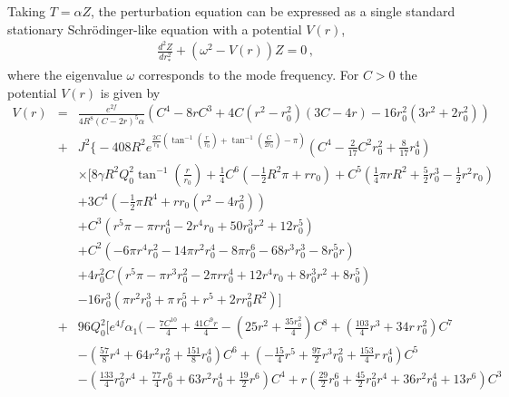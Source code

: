 \documentclass[aps,prd,12pt,superscriptaddress]{revtex4-2}
\begin{document}
Taking $T =\alpha Z$, the perturbation equation can be expressed as a single standard stationary Schrödinger-like equation with a potential $V(r)$,
\begin{eqnarray}
\label{schroe}
    \frac{d^2 Z}{d{r^2_*}}
    + (\omega^2 - V(r))Z = 0 \, ,
\end{eqnarray}
where the eigenvalue $\omega$ corresponds to the mode frequency.
For $C>0$ the potential $V(r)$ is given by
\begin{eqnarray}
    V(r) &=&
    \frac{e^{2f} }{4 R^8 (C-2r)^5    \alpha} 
  (C^4-8rC^3+4C (r^2-r_0^2) (3C-4r) - 16r_0^2 (3r^2+2r_0^2) )
  \nonumber 
  \\    
   &+&  J^2 \big\{
-408
R^{2} { e}^{\frac{2 C}{r_0}  (\tan^{-1}(\frac{r}{r_0}) +\tan^{-1}(\frac{C}{2 r_0}) -\pi)}
(C^{4}-\frac{2}{17} C^{2} r_0^{2}+\frac{8}{17} r_0^{4}) 
 \nonumber 
  \\  &&  \times 
[8 \gamma R^{2}  Q_0^{2} \tan^{-1}\left(\frac{r}{r_0}\right)
+ \frac{1}{4} C^{6} (-\frac{1}{2} R^{2} \pi 
+ r r_0 ) +  C^{5}
(\frac{1}{4} \pi  r R^{2}+\frac{5}{2} r_0^{3} -\frac{1}{2} r^{2} r_0 )
 \nonumber 
  \\   &&
+3  C^{4} (-\frac{1}{2} \pi R^4 + rr_0 (r^2 -4 r_0^{2}) )
 \nonumber 
  \\ &&   
+C^{3} (r^{5} \pi -\pi  r r_0^{4}-2 r^{4} r_0 +50 r_0^{3} r^{2}+12 r_0^{5}) 
 \nonumber 
  \\ &&   
+C^{2} (-6 \pi  r^{4} r_0^{2}-14 \pi  r^{2} r_0^{4}-8 \pi  r_0^{6}-68 r^{3} r_0^{3}-8 r_0^{5} r ) 
 \nonumber 
  \\ &&   
+4 r_0^{2} C (r^{5} \pi -\pi  r^{3} r_0^{2}-2 \pi  r r_0^{4}+12 r^{4} r_0 +8 r_0^{3} r^{2}+8 r_0^{5})  
 \nonumber 
  \\ &&   
-16 r_0^{3} (\pi  r^{2} r_0^{3}+\pi  \,r_0^{5}+r^{5}+2 r r_0^{2} R^2)
] 
 \nonumber 
 \\
&+& 96 Q_0^{2} \big[
{ e}^{4f} \alpha_1 
\big(
 -\frac{7 C^{10}}{4}+\frac{41 C^{9} r}{4}
-(25 r^{2}+\frac{35 r_0^{2}}{4}) C^{8}
+(\frac{103}{4} r^{3}+34 r \,r_0^{2}) C^{7}
 \nonumber 
  \\ &&   
-(\frac{57}{8} r^{4}+64 r^{2} r_0^{2}+\frac{151}{8} r_0^{4}) C^{6}
+(-\frac{15}{4} r^{5}
+\frac{97}{2} r^{3} r_0^{2}+\frac{153}{4} r \,r_0^{4}) C^{5}
 \nonumber 
  \\ &&   
-(\frac{133}{4} r_0^{2} r^{4}+\frac{77}{4} r_0^{6}+63 r^{2} r_0^{4}+\frac{19}{2} r^{6}) C^{4}+r (\frac{29}{2} r_0^{6}+\frac{45}{2} r_0^{2} r^{4}+36 r^{2} r_0^{4}+13r^{6}) C^{3}

\end{eqnarray}
\end{document}
